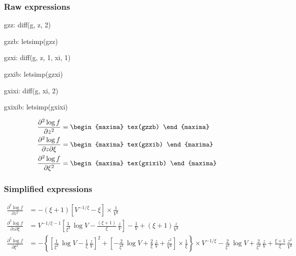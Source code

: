\subsubsection*{Raw expressions}
\begin{maxima}
  gzz: diff(g, z, 2)
\end{maxima}%

\begin{maxima}
  gzzb: letsimp(gzz)
\end{maxima}%

\begin{maxima}
  gzxi: diff(g, z, 1, xi, 1)
\end{maxima}%

\begin{maxima}
  gzxib: letsimp(gzxi)
\end{maxima}%

\begin{maxima}
  gxixi: diff(g, xi, 2)
\end{maxima}%

\begin{maxima}
  gxixib: letsimp(gxixi)
\end{maxima}%

{\color{MonVertF}
\begin{align*}
  \frac{\partial^2 \log f}{\partial z^2}
  &=
  \begin{maxima}
    tex(gzzb)
  \end{maxima}\\
  \frac{\partial^2 \log f}{\partial z \partial \xi}
  &=
  \begin{maxima}
    tex(gzxib)
  \end{maxima}\\
  \frac{\partial^2 \log f}{\partial \xi^2}
  &=
  \begin{maxima}
    tex(gxixib)
  \end{maxima}
\end{align*}
}

\subsubsection*{Simplified expressions}
{\color{red}
\begin{align*}
  \frac{\partial^2 \log f}{\partial z^2}
  &= - (\xi + 1) \left[V^{-1/\xi} - \xi\right] \times \frac{1}{ V^2}\\
  \frac{\partial^2 \log f}{\partial z \partial \xi}
  &=  V^{-1/\xi -1}
    \left[\frac{1}{\xi^2} \,\log V - \frac{(\xi + 1)}{\xi}\,\frac{z}{V} \right]
    - \frac{1}{V} + (\xi +1) \frac{z}{V^2}   \\
  \frac{\partial^2 \log f}{\partial \xi^2} 
  &= - \left\{ \left[\frac{1}{\xi^2} \, \log V - \frac{1}{\xi}\,\frac{z}{V} \right]^2 +
    \left[ - \frac{2}{\xi^2}\,\log V + \frac{2}{\xi}\,\frac{z}{V}
    + \frac{z^2}{V^2}\right] \times
    \frac{1}{\xi} \right\} \times V^{-1/\xi} - \frac{2}{\xi^3}\,\log V +
    \frac{2}{\xi^2}\,\frac{z}{V} + \frac{\xi +1}{\xi}\, \frac{z^2}{V^2}
\end{align*}
}





